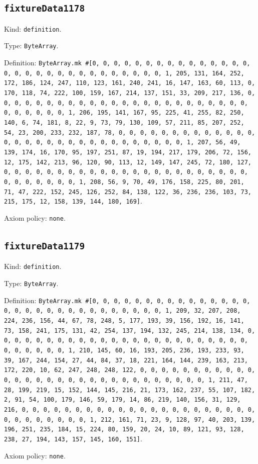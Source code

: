 \documentclass[11pt]{article}
\begin{document}
\subsection*{\texttt{fixtureData1178}}
\noindent Kind: \texttt{definition}.\par
\noindent Type: \texttt{ByteArray}.\par
\noindent Definition: \texttt{ByteArray.mk \#[0, 0, 0, 0, 0, 0, 0, 0, 0, 0, 0, 0, 0, 0, 0, 0, 0, 0, 0, 0, 0, 0, 0, 0, 0, 0, 0, 0, 0, 0, 1, 205, 131, 164, 252, 172, 186, 124, 247, 110, 123, 161, 240, 241, 16, 147, 163, 60, 113, 0, 170, 118, 74, 222, 100, 159, 167, 214, 137, 151, 33, 209, 217, 136, 0, 0, 0, 0, 0, 0, 0, 0, 0, 0, 0, 0, 0, 0, 0, 0, 0, 0, 0, 0, 0, 0, 0, 0, 0, 0, 0, 0, 0, 0, 1, 206, 195, 141, 167, 95, 225, 41, 255, 82, 250, 140, 6, 74, 181, 8, 22, 9, 73, 79, 130, 109, 57, 211, 85, 207, 252, 54, 23, 200, 233, 232, 187, 78, 0, 0, 0, 0, 0, 0, 0, 0, 0, 0, 0, 0, 0, 0, 0, 0, 0, 0, 0, 0, 0, 0, 0, 0, 0, 0, 0, 0, 0, 0, 1, 207, 56, 49, 139, 174, 16, 170, 95, 197, 251, 87, 19, 194, 217, 179, 206, 72, 156, 12, 175, 142, 213, 96, 120, 90, 113, 12, 149, 147, 245, 72, 180, 127, 0, 0, 0, 0, 0, 0, 0, 0, 0, 0, 0, 0, 0, 0, 0, 0, 0, 0, 0, 0, 0, 0, 0, 0, 0, 0, 0, 0, 0, 0, 1, 208, 56, 9, 70, 49, 176, 158, 225, 80, 201, 71, 47, 222, 152, 245, 126, 252, 84, 138, 122, 36, 236, 236, 103, 73, 215, 175, 12, 158, 139, 144, 180, 169]}.\par
\noindent Axiom policy: \texttt{none}.\par
\subsection*{\texttt{fixtureData1179}}
\noindent Kind: \texttt{definition}.\par
\noindent Type: \texttt{ByteArray}.\par
\noindent Definition: \texttt{ByteArray.mk \#[0, 0, 0, 0, 0, 0, 0, 0, 0, 0, 0, 0, 0, 0, 0, 0, 0, 0, 0, 0, 0, 0, 0, 0, 0, 0, 0, 0, 0, 0, 1, 209, 32, 207, 208, 224, 236, 156, 44, 67, 78, 248, 5, 177, 193, 39, 156, 192, 16, 141, 73, 158, 241, 175, 131, 42, 254, 137, 194, 132, 245, 214, 138, 134, 0, 0, 0, 0, 0, 0, 0, 0, 0, 0, 0, 0, 0, 0, 0, 0, 0, 0, 0, 0, 0, 0, 0, 0, 0, 0, 0, 0, 0, 0, 1, 210, 145, 60, 16, 193, 205, 236, 193, 233, 93, 39, 167, 244, 154, 27, 44, 84, 37, 18, 221, 164, 144, 239, 163, 213, 172, 220, 10, 62, 247, 248, 248, 122, 0, 0, 0, 0, 0, 0, 0, 0, 0, 0, 0, 0, 0, 0, 0, 0, 0, 0, 0, 0, 0, 0, 0, 0, 0, 0, 0, 0, 0, 0, 1, 211, 47, 28, 199, 219, 15, 152, 144, 145, 216, 21, 173, 162, 237, 55, 107, 182, 2, 91, 54, 100, 179, 146, 59, 179, 14, 86, 219, 140, 156, 31, 129, 216, 0, 0, 0, 0, 0, 0, 0, 0, 0, 0, 0, 0, 0, 0, 0, 0, 0, 0, 0, 0, 0, 0, 0, 0, 0, 0, 0, 0, 0, 0, 1, 212, 161, 71, 23, 9, 128, 97, 40, 203, 139, 196, 251, 235, 184, 15, 224, 80, 159, 20, 24, 10, 89, 121, 93, 128, 238, 27, 194, 143, 157, 145, 160, 151]}.\par
\noindent Axiom policy: \texttt{none}.\par
\end{document}
